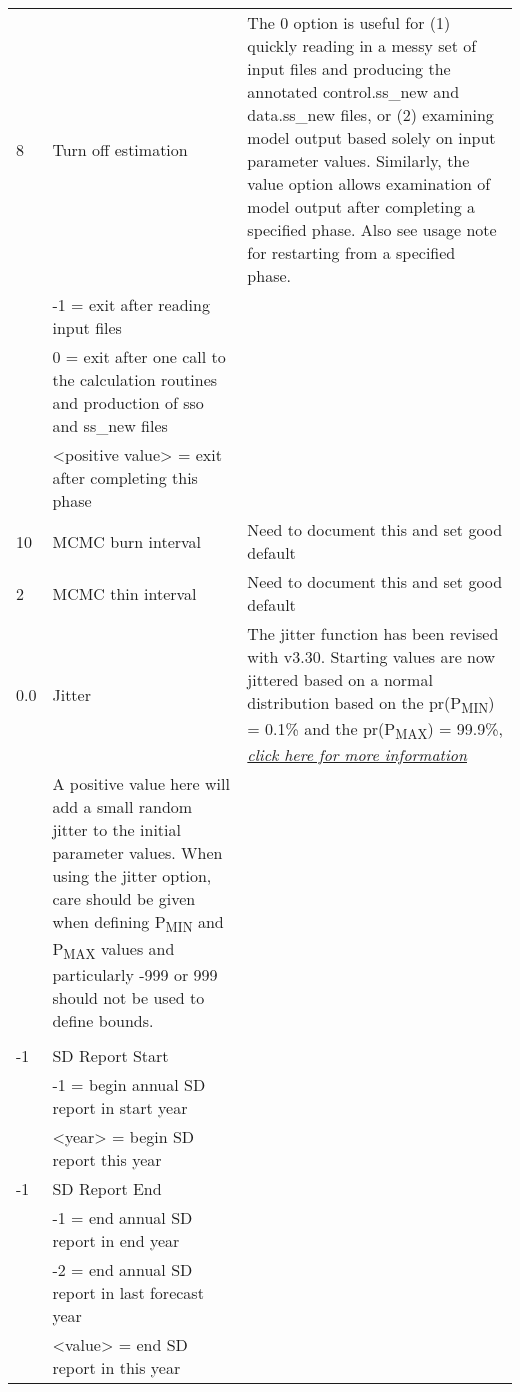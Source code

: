 \begin{landscape}
\begin{longtable}{p{1.5cm} p{7cm} p{12.5cm}}
 \hline
 8 & Turn off estimation &  \multirow{1}{1cm}[-0.1cm]{\parbox{12.5cm}{The 0 option is useful for (1) quickly reading in a messy set of input files and producing the annotated control.ss\_new and data.ss\_new files, or (2) examining model output based solely on input parameter values.  Similarly, the value option allows examination of model output after completing a specified phase.  Also see usage note for restarting from a specified phase.}}\\
   & -1 = exit after reading input files & \\
   & 0 = exit after one call to the calculation routines and production of sso and ss\_new files & \\
   & <positive value> = exit after completing this phase & \\	  
	     
 \hline
 10 & MCMC burn interval & Need to document this and set good default \\
	   
 \hline
 2 & MCMC thin interval & Need to document this and set good default \\
	   
 \hline 
 0.0 & Jitter & \multirow{1}{1cm}[-0.1cm]{\parbox{12.5cm}{The jitter function has been revised with v3.30.  Starting values are now jittered based on a normal distribution based on the pr(P\textsubscript{MIN}) = 0.1\% and the pr(P\textsubscript{MAX}) = 99.9\%, \hyperlink{Jitter}{\textit{click here for more information}} }}\\
	 & A positive value here will add a small random jitter to the initial parameter values.  When using the jitter option, care should be given when defining P\textsubscript{MIN} and P\textsubscript{MAX} values and particularly -999 or 999 should not be used to define bounds. & \\
	 & &  \\
	
 -1 & SD Report Start & \\
    & -1 = begin annual SD report in start year & \\
    & <year> = begin SD report this year & \\
	      
 \hline
 -1 & SD Report End & \\
    & -1 = end annual SD report in end year & \\
    & -2 = end annual SD report in last forecast year & \\
    & <value> = end SD report in this year & \\
	   

\end{longtable}
\end{landscape}
